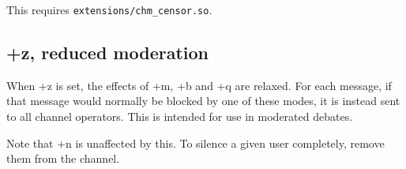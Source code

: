 	This requires \nolinkurl{extensions/chm\_censor.so}.

\subsection{+z, reduced moderation}
	When +z is set, the effects of +m, +b and +q are relaxed. For each
	message, if that message would normally be blocked by one of these
	modes, it is instead sent to all channel operators. This is intended
	for use in moderated debates.

	Note that +n is unaffected by this. To silence a given user completely,
	remove them from the channel.

